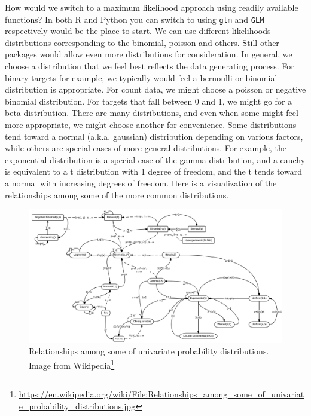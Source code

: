 \documentclass[
  letterpaper,
]{krantz}
\DeclareRobustCommand{\href}[2]{#2\footnote{\url{#1}}}
\begin{document}
How would we switch to a maximum likelihood approach using readily
available functions? In both R and Python you can switch to using
\texttt{glm} and \texttt{GLM} respectively would be the place to start.
We can use different likelihoods distributions corresponding to the
binomial, poisson and others. Still other packages would allow even more
distributions for consideration. In general, we choose a distribution
that we feel best reflects the data generating process. For binary
targets for example, we typically would feel a bernoulli or binomial
distribution is appropriate. For count data, we might choose a poisson
or negative binomial distribution. For targets that fall between 0 and
1, we might go for a beta distribution. There are many distributions,
and even when some might feel more appropriate, we might choose another
for convenience. Some distributions tend toward a normal (a.k.a.
gaussian) distribution depending on various factors, while others are
special cases of more general distributions. For example, the
exponential distribution is a special case of the gamma distribution,
and a cauchy is equivalent to a t distribution with 1 degree of freedom,
and the t tends toward a normal with increasing degrees of freedom. Here
is a visualization of the relationships among some of the more common
distributions.

\begin{figure}

{\centering \includegraphics[width=10.95in,height=\textheight]{img/distribution_relationships.jpg}

}

\caption{\label{fig-distribution-relationships}Relationships among some
of univariate probability distributions. Image from
\href{https://en.wikipedia.org/wiki/File:Relationships_among_some_of_univariate_probability_distributions.jpg}{Wikipedia}}

\end{figure}
\end{document}
